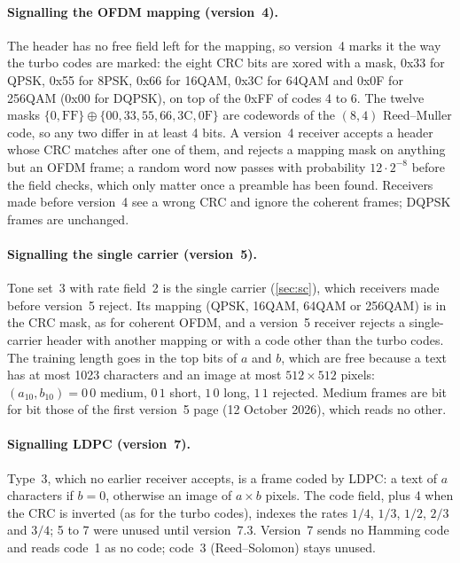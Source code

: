 \documentclass[11pt,a4paper]{article}
\theoremstyle{remark}
\begin{document}
\paragraph{Signalling the OFDM mapping (version~4).}
The header has no free field left for the mapping, so version~4 marks it the way the turbo codes are marked: the eight CRC bits are xored with a mask, 0x33 for QPSK, 0x55 for 8PSK, 0x66 for 16QAM, 0x3C for 64QAM and 0x0F for 256QAM (0x00 for DQPSK), on top of the 0xFF of codes 4 to 6. The twelve masks $\{0, \mathrm{FF}\} \oplus \{00, 33, 55, 66, 3\mathrm{C}, 0\mathrm{F}\}$ are codewords of the $(8, 4)$ Reed--Muller code, so any two differ in at least 4 bits. A version~4 receiver accepts a header whose CRC matches after one of them, and rejects a mapping mask on anything but an OFDM frame; a random word now passes with probability $12 \cdot 2^{-8}$ before the field checks, which only matter once a preamble has been found. Receivers made before version~4 see a wrong CRC and ignore the coherent frames; DQPSK frames are unchanged.

\paragraph{Signalling the single carrier (version~5).}
Tone set~3 with rate field~2 is the single carrier (\cref{sec:sc}), which receivers made before version~5 reject. Its mapping (QPSK, 16QAM, 64QAM or 256QAM) is in the CRC mask, as for coherent OFDM, and a version~5 receiver rejects a single-carrier header with another mapping or with a code other than the turbo codes. The training length goes in the top bits of $a$ and $b$, which are free because a text has at most 1023 characters and an image at most $512 \times 512$ pixels: $(a_{10}, b_{10}) = 0\,0$ medium, $0\,1$ short, $1\,0$ long, $1\,1$ rejected. Medium frames are bit for bit those of the first version~5 page (12 October 2026), which reads no other.

\paragraph{Signalling LDPC (version~7).}
Type~3, which no earlier receiver accepts, is a frame coded by LDPC: a text of $a$ characters if $b = 0$, otherwise an image of $a \times b$ pixels. The code field, plus 4 when the CRC is inverted (as for the turbo codes), indexes the rates $1/4$, $1/3$, $1/2$, $2/3$ and $3/4$; 5 to 7 were unused until version~7.3. Version~7 sends no Hamming code and reads code~1 as no code; code~3 (Reed--Solomon) stays unused.
\end{document}
